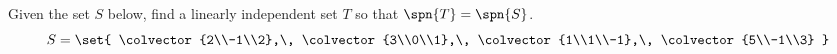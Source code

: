 Given the set $S$ below, find a linearly independent set $T$ so that $\spn{T}=\spn{S}$.
%
\begin{equation*}
S=\set{
\colvector{2\\-1\\2},\,
\colvector{3\\0\\1},\,
\colvector{1\\1\\-1},\,
\colvector{5\\-1\\3}
}
\end{equation*}
%